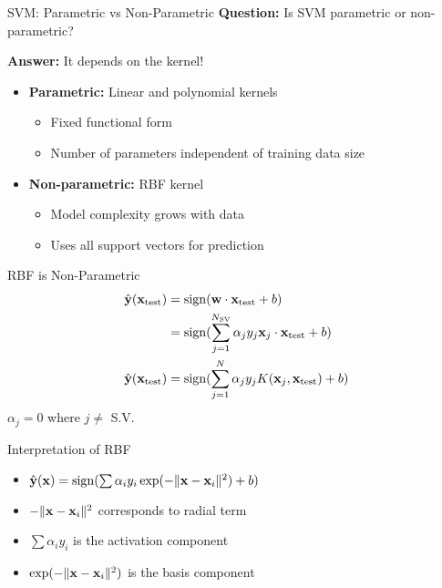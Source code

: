 \documentclass{beamer}
\begin{document}
	\begin{frame}{SVM: Parametric vs Non-Parametric}
	    \textbf{Question:} Is SVM parametric or non-parametric?
	    
	    \pause
	    \textbf{Answer:} It depends on the kernel!
	    
	    \begin{itemize}
	    	\item \textbf{Parametric:} Linear and polynomial kernels
	    		\begin{itemize}
	    			\item Fixed functional form
	    			\item Number of parameters independent of training data size
	    		\end{itemize}
	    	\item \textbf{Non-parametric:} RBF kernel
	    		\begin{itemize}
	    			\item Model complexity grows with data
	    			\item Uses all support vectors for prediction
	    		\end{itemize}
	    \end{itemize}
	\end{frame}
	\begin{frame}{RBF is Non-Parametric}
	    \begin{align*}
	        \hat{\mathbf{y}}(\mathbf{x}_{\text{test}}) &= \operatorname{sign}(\mathbf{w} \cdot \mathbf{x}_{\text{test}} + b) \\
	        &= \operatorname{sign}(\sum_{j=1}^{N_{\text{SV}}}\alpha_{j}y_{j}\mathbf{x}_{j} \cdot \mathbf{x}_{\text{test}} + b)\\
	        \hat{\mathbf{y}}(\mathbf{x}_{\text{test}}) &= \operatorname{sign}(\sum_{j=1}^{N}\alpha_{j}y_{j} K(\mathbf{x}_{j}, \mathbf{x}_{\text{test}}) + b)
	    \end{align*}
	    $\alpha_{j} = 0$ where $j \neq$ S.V.
	\end{frame}

	\begin{frame}{Interpretation of RBF}
		\begin{itemize}[<+->]
			\item $\hat{\mathbf{y}}(\mathbf{x}) = \operatorname{sign}(\sum \alpha_{i}y_{i}\exp(-\|\mathbf{x} - \mathbf{x}_{i}\|^{2}) + b)$
			\item $-\|\mathbf{x} - \mathbf{x}_{i}\|^{2}$ corresponds to radial term
			\item $\sum \alpha_{i}y_{i}$ is the activation component
			\item $\exp(-\|\mathbf{x} - \mathbf{x}_{i}\|^{2})$ is the basis component
		\end{itemize}
	    
	    
	\end{frame}
\end{document}
